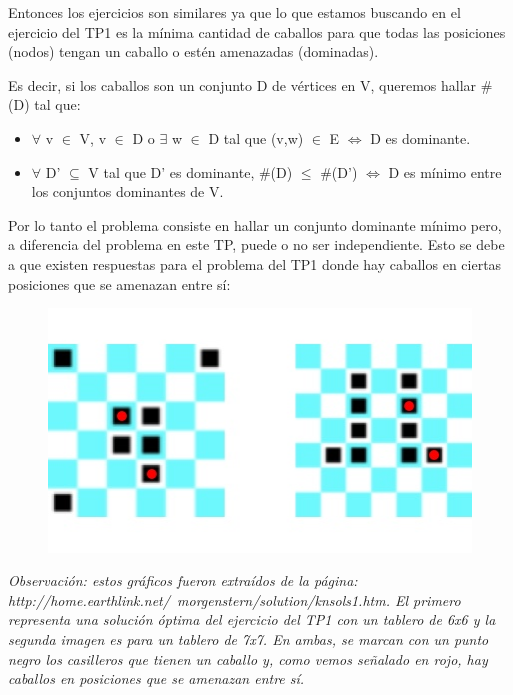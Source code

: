 \medskip

Entonces los ejercicios son similares ya que lo que estamos buscando en el ejercicio del TP1 es la mínima cantidad de caballos para que todas las posiciones (nodos) tengan un caballo o estén amenazadas (dominadas).

Es decir, si los caballos son un conjunto D de vértices en V, queremos hallar \#(D) tal que:
\begin{itemize}
\item $\forall$ v $\in$ V, v $\in$ D o $\exists$ w $\in$ D tal que (v,w) $\in$ E $\iff$ D es dominante.
\item $\forall$ D' $\subseteq$ V tal que D' es dominante, \#(D) $\leq$ \#(D') $\iff$ D es mínimo entre los conjuntos dominantes de V.
\end{itemize}

Por lo tanto el problema consiste en hallar un conjunto dominante mínimo pero, a diferencia del problema en este TP, puede o no ser independiente.
Esto se debe a que existen respuestas para el problema del TP1 donde hay caballos en ciertas posiciones que se amenazan entre sí:

\begin{figure}[h]
\begin{center}
\includegraphics[scale=0.5]{imagenes/grafos-ej1-tp3-3.jpg}
\end{center}
\end{figure}

\textit{Observación: estos gráficos fueron extraídos de la página: http://home.earthlink.net/~morgenstern/solution/knsols1.htm. El primero representa una solución óptima del ejercicio del TP1 con un tablero de 6x6 y la segunda imagen es para un tablero de 7x7. En ambas, se marcan con un punto negro los casilleros que tienen un caballo y, como vemos señalado en rojo, hay caballos en posiciones que se amenazan entre sí.}


